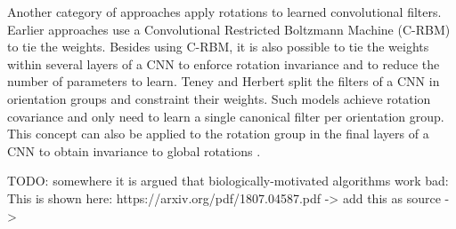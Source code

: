 Another category of approaches apply rotations to learned convolutional filters.
Earlier approaches  use a Convolutional Restricted Boltzmann Machine (C-RBM)  to tie the weights.
Besides using C-RBM, it is also possible to tie the weights within several layers of a CNN to enforce rotation invariance and to reduce the number of parameters to learn. 
Teney and Herbert  split the filters of a CNN in orientation groups and constraint their weights.
Such models achieve rotation covariance and only need to learn a single canonical filter per orientation group.
This concept can also be applied to the rotation group in the final layers of a CNN to obtain invariance to global rotations .









TODO: somewhere it is argued that biologically-motivated algorithms work bad: This is shown here: https://arxiv.org/pdf/1807.04587.pdf -> add this as source -> 